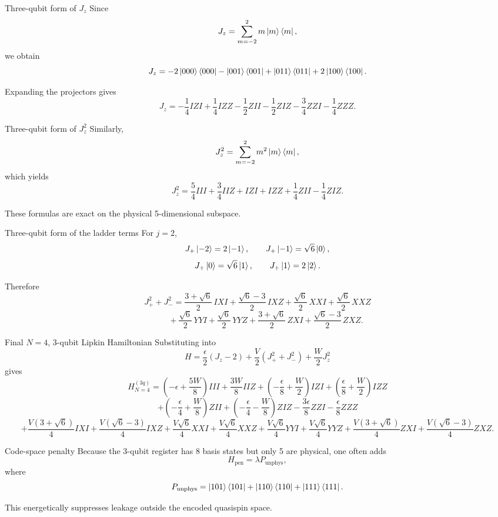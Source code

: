 \documentclass[aspectratio=169]{beamer}
\begin{document}
\begin{frame}{Three-qubit form of \(J_z\)}
Since
\[
J_z = \sum_{m=-2}^2 m\ket{m}\bra{m},
\]
we obtain
\[
J_z
=
-2\ket{000}\bra{000}
-\ket{001}\bra{001}
+\ket{011}\bra{011}
+2\ket{100}\bra{100}.
\]

Expanding the projectors gives
\[
J_z
=
-\frac{1}{4} IZI
+\frac{1}{4} IZZ
-\frac{1}{2} ZII
-\frac{1}{2} ZIZ
-\frac{3}{4} ZZI
-\frac{1}{4} ZZZ.
\]
\end{frame}

\begin{frame}{Three-qubit form of \(J_z^2\)}
Similarly,
\[
J_z^2 = \sum_{m=-2}^2 m^2 \ket{m}\bra{m},
\]
which yields
\[
J_z^2
=
\frac{5}{4} III
+\frac{3}{4} IIZ
+IZI
+IZZ
+\frac{1}{4} ZII
-\frac{1}{4} ZIZ.
\]

These formulas are exact on the physical 5-dimensional subspace.
\end{frame}

\begin{frame}{Three-qubit form of the ladder terms}
For \(j=2\),
\[
J_+\ket{-2}=2\ket{-1},\qquad
J_+\ket{-1}=\sqrt{6}\ket{0},
\]
\[
J_+\ket{0}=\sqrt{6}\ket{1},\qquad
J_+\ket{1}=2\ket{2}.
\]

Therefore
\[
J_+^2+J_-^2
=
\frac{3+\sqrt{6}}{2}\,IXI
+\frac{\sqrt{6}-3}{2}\,IXZ
+\frac{\sqrt{6}}{2}\,XXI
+\frac{\sqrt{6}}{2}\,XXZ
\]
\[
\qquad
+\frac{\sqrt{6}}{2}\,YYI
+\frac{\sqrt{6}}{2}\,YYZ
+\frac{3+\sqrt{6}}{2}\,ZXI
+\frac{\sqrt{6}-3}{2}\,ZXZ.
\]
\end{frame}

\begin{frame}{Final \(N=4\), 3-qubit Lipkin Hamiltonian}
Substituting into
\[
H = \frac{\epsilon}{2}(J_z-2) + \frac{V}{2}(J_+^2+J_-^2) + \frac{W}{2}J_z^2
\]
gives
\[
H_{N=4}^{(3q)}
=
\left(-\epsilon+\frac{5W}{8}\right)III
+\frac{3W}{8}IIZ
+\left(-\frac{\epsilon}{8}+\frac{W}{2}\right)IZI
+\left(\frac{\epsilon}{8}+\frac{W}{2}\right)IZZ
\]
\[
+\left(-\frac{\epsilon}{4}+\frac{W}{8}\right)ZII
+\left(-\frac{\epsilon}{4}-\frac{W}{8}\right)ZIZ
-\frac{3\epsilon}{8}ZZI
-\frac{\epsilon}{8}ZZZ
\]
\[
+\frac{V(3+\sqrt{6})}{4}IXI
+\frac{V(\sqrt{6}-3)}{4}IXZ
+\frac{V\sqrt{6}}{4}XXI
+\frac{V\sqrt{6}}{4}XXZ
+\frac{V\sqrt{6}}{4}YYI
+\frac{V\sqrt{6}}{4}YYZ
+\frac{V(3+\sqrt{6})}{4}ZXI
+\frac{V(\sqrt{6}-3)}{4}ZXZ.
\]
\end{frame}

\begin{frame}{Code-space penalty}
Because the 3-qubit register has 8 basis states but only 5 are physical, one often adds
\[
H_{\mathrm{pen}} = \lambda P_{\mathrm{unphys}},
\]
where
\[
P_{\mathrm{unphys}}
=
\ket{101}\bra{101}
+\ket{110}\bra{110}
+\ket{111}\bra{111}.
\]

This energetically suppresses leakage outside the encoded quasispin space.
\end{frame}
\end{document}
